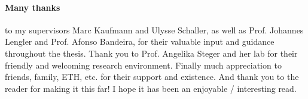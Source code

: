 \paragraph{Many thanks} to my supervisors Marc Kaufmann and Ulysse Schaller, as well as Prof. Johannes Lengler and Prof. Afonso Bandeira, for their valuable input and guidance throughout the thesis. Thank you to Prof. Angelika Steger and her lab for their friendly and welcoming research environment. Finally much appreciation to friends, family, ETH, etc. for their support and existence. And thank you to the reader for making it this far! I hope it has been an enjoyable / interesting read.









